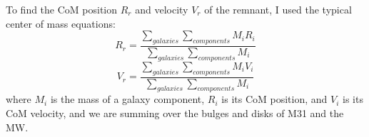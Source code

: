 \documentclass[twocolumn]{aastex631}
\begin{document}
To find the CoM position $R_r$ and velocity $V_r$ of the remnant, I used the typical center of mass equations:
\begin{equation} \label{eq:comR}
    R_r = \frac{\sum_{galaxies}\sum_{components}M_iR_i}{\sum_{galaxies}\sum_{components}M_i}
\end{equation}
\begin{equation} \label{eq:comV}
    V_r = \frac{\sum_{galaxies}\sum_{components}M_iV_i}{\sum_{galaxies}\sum_{components}M_i}
\end{equation}
where $M_i$ is the mass of a galaxy component, $R_i$ is its CoM position, and $V_i$ is its CoM velocity, and we are summing over the bulges and disks of M31 and the MW.
\end{document}
